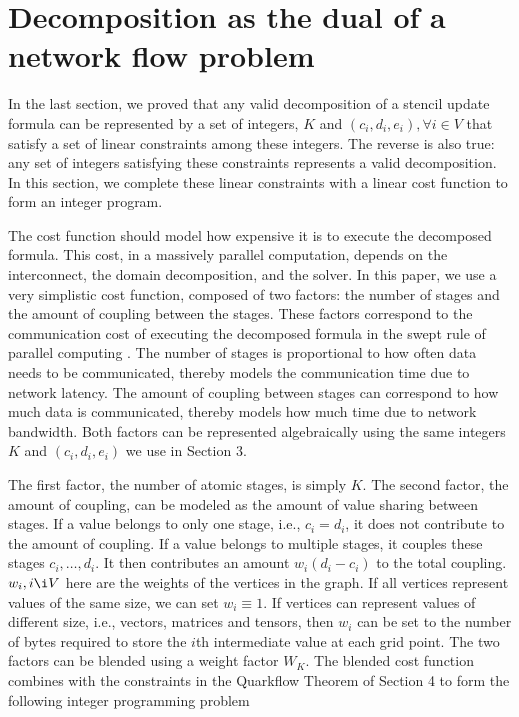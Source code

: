 \documentclass[review]{siamart0216}
\begin{document}
\section{Decomposition as the dual of a network flow problem}

In the last section, we proved that any valid decomposition of a stencil
update formula can be represented by a set of integers, $K$
and $(c_i,d_i,e_i),\forall i\in V$ that satisfy a set of linear constraints
among these integers.  The reverse is also true: any set of integers satisfying
these constraints represents a valid decomposition.  In this section, we
complete these linear constraints with a linear cost function to form
an integer program.

The cost function should model how expensive it is to execute the
decomposed formula.  This cost, in a massively parallel computation, depends
on the interconnect, the domain decomposition, and the solver.
In this paper, we use a very simplistic cost function, composed of
two factors:
the number of stages and the amount of coupling between the stages.
These factors correspond to the communication cost
of executing the decomposed formula in the swept rule of parallel computing
\cite{alhubail2016swept}.  The number of stages is proportional to how often
data needs to be communicated, thereby models the communication
time due to network latency.  The amount of coupling between stages can
correspond to how much data is communicated, thereby models
how much time due to network bandwidth.
Both factors can be represented algebraically using the same
integers $K$ and $(c_i,d_i,e_i)$ we use in Section 3.

The first factor, the number of atomic stages, is simply $K$.  The second
factor, the amount of coupling, can be modeled as the amount of
value sharing between stages.  If a value belongs to only one stage,
i.e., $c_i=d_i$, it does not contribute to the amount of coupling.
If a value belongs to multiple stages, it couples these stages $c_i,\ldots,d_i$.
It then contributes an amount $w_i (d_i-c_i)$ to the total coupling.
$w_i,i\i V$ here are the weights of the vertices in the graph.  If all vertices
represent values of the same size, we can set $w_i\equiv 1$.  If vertices
can represent values of different size, i.e., vectors, matrices and tensors,
then $w_i$ can be set to the number of bytes required to store the $i$th
intermediate value at each grid point.  The two factors can be blended using
a weight factor $W_K$.  The blended cost function combines with the
constraints in the Quarkflow Theorem of Section 4 to form the following integer
programming problem
\end{document}
